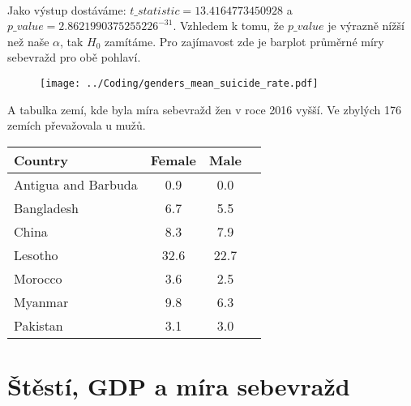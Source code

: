 \documentclass[12pt]{article}
\begin{document}
\paragraph{}
Jako výstup dostáváme: $t\_statistic = 13.4164773450928$ a $p\_value = 2.8621990375255226^{-31}$. Vzhledem k tomu, že $p\_value$ je výrazně nížší než naše $\alpha$, tak $H_0$ zamítáme. Pro zajímavost zde je barplot průměrné míry sebevražd pro obě pohlaví. 
\begin{figure}[hbt]
  \centering
  \texttt{[image: ../Coding/genders\_mean\_suicide\_rate.pdf]}
  \label{fig:plot}
\end{figure}

\newpage
A tabulka zemí, kde byla míra sebevražd žen v roce 2016 vyšší. Ve zbylých 176 zemích převažovala u mužů.
\begin{table}[htb]
\centering
\label{tab:suicide-rates}
\begin{tabular}{lccc}
\hline
Country & Female & Male \\
\hline
Antigua and Barbuda & 0.9 & 0.0 \\
Bangladesh & 6.7 & 5.5 \\
China & 8.3 & 7.9 \\
Lesotho & 32.6 & 22.7 \\
Morocco & 3.6 & 2.5 \\
Myanmar & 9.8 & 6.3 \\
Pakistan & 3.1 & 3.0 \\
\hline
\end{tabular}
\end{table}

\section{Štěstí, GDP a míra sebevražd}


\renewcommand\refname{Reference}


\end{document}
